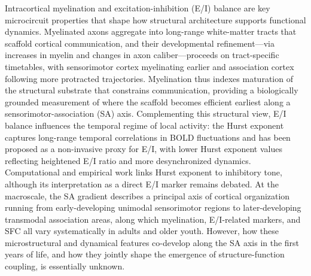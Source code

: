 



Intracortical myelination and excitation-inhibition (E/I) balance are key microcircuit properties that shape how structural architecture supports functional dynamics\cite{fotiadisMyelinationExcitationinhibitionBalance2023}. Myelinated axons aggregate into long-range white-matter tracts that scaffold cortical communication, and their developmental refinement—via increases in myelin and changes in axon caliber—proceeds on tract-specific timetables, with sensorimotor cortex myelinating earlier and association cortex following more protracted trajectories\cite{millerProlongedMyelinationHuman2012,deoniCorticalMaturationMyelination2015a}. Myelination thus indexes maturation of the structural substrate that constrains communication, providing a biologically grounded measurement of where the scaffold becomes efficient earliest along a sensorimotor-association (SA) axis\cite{baumGradedVariationT1w2022,yuInitialMyelinationCentral2023}. Complementing this structural view, E/I balance influences the temporal regime of local activity: the Hurst exponent captures long-range temporal correlations in BOLD fluctuations and has been proposed as a non-invasive proxy for E/I, with lower Hurst exponent values reflecting heightened E/I ratio and more desynchronized dynamics\cite{fotiadisMyelinationExcitationinhibitionBalance2023,bruiningMeasurementExcitationinhibitionRatio2020}. Computational and empirical work links Hurst exponent to inhibitory tone, although its interpretation as a direct E/I marker remains debated\cite{nishioHurstExponentMarker2024}. At the macroscale, the SA gradient describes a principal axis of cortical organization running from early-developing unimodal sensorimotor regions to later-developing transmodal association areas, along which myelination, E/I-related markers, and SFC all vary systematically in adults and older youth\cite{fotiadisMyelinationExcitationinhibitionBalance2023,larsenDevelopmentalReductionExcitation2022}. However, how these microstructural and dynamical features co-develop along the SA axis in the first years of life, and how they jointly shape the emergence of structure-function coupling, is essentially unknown.

